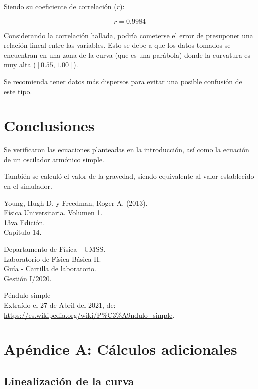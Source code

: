 \documentclass[letter,11pt]{article}
\begin{document}
Siendo su coeficiente de correlación ($r$):

\begin{equation*}
    r = 0.9984
\end{equation*}
\vspace{0.10cm}

Considerando la correlación hallada, podría cometerse el error de presuponer una
relación lineal entre las variables. Esto se debe a que los datos tomados se
encuentran en una zona de la curva (que es una parábola) donde la curvatura es
muy alta ($[0.55, 1.00]$).

Se recomienda tener datos más dispersos para evitar una posible confusión de
este tipo.

\section{Conclusiones}

Se verificaron las ecuaciones planteadas en la introducción, así como la
ecuación de un oscilador armónico simple.

También se calculó el valor de la gravedad, siendo equivalente al valor
establecido en el simulador.

\begin{thebibliography}{99}

 Young, Hugh D. y Freedman, Roger A. (2013).\\
Física Universitaria. Volumen 1.\\
13va Edición.\\
Capitulo 14.

 Departamento de Física - UMSS.\\
Laboratorio de Física Básica II.\\
Guía - Cartilla de laboratorio.\\
Gestión I/2020.

 Péndulo simple \\
Extraído el 27 de Abril del 2021, de: \\
\url{https://es.wikipedia.org/wiki/P%C3%A9ndulo_simple}.

\end{thebibliography}

\newpage
\section*{Apéndice A: Cálculos adicionales}

\subsection{Linealización de la curva}
\end{document}
